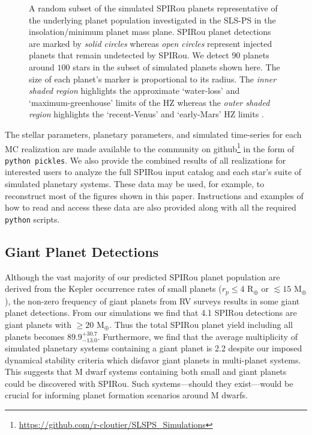 \begin{figure*}
  \centering
  \caption{A random subset of the simulated SPIRou planets representative of the underlying planet
    population investigated in the SLS-PS in the insolation/minimum planet mass plane.
    SPIRou planet detections are marked by
    \emph{solid circles} whereas \emph{open circles} represent injected planets that remain undetected by SPIRou.
    We detect 90 planets around $100$ stars in the subset of simulated planets shown here.
    The size of each planet's marker is proportional to its radius. The \emph{inner shaded region} highlights
    the approximate `water-loss' and `maximum-greenhouse' limits of the HZ whereas the
    \emph{outer shaded region} highlights the `recent-Venus' and `early-Mars' HZ limits \citep{kopparapu13}.}
  \label{BSfig:spiroudet}
\end{figure*}


The stellar parameters, planetary parameters, and simulated time-series for each MC realization are made
available to the community on
github\footnote{\href{https://github.com/r-cloutier/SLSPS\_Simulations}{https://github.com/r-cloutier/SLSPS\_Simulations}}
in the form of \texttt{python pickles}.
We also provide the combined results of all realizations for interested users to analyze the full SPIRou
input catalog and each star's suite of simulated planetary systems. These data may be used, for example,
to reconstruct most of the figures shown in this paper. Instructions and examples of how to read and
access these data are also provided along with all the required \texttt{python} scripts.


\subsection{Giant Planet Detections}
Although the vast majority of our predicted SPIRou planet population are derived from the Kepler occurrence
rates of small planets ($r_p \leq 4$ R$_{\oplus}$ or \msini{} $\lesssim 15$ M$_{\oplus}$), the non-zero frequency
of giant planets from RV surveys results in some giant planet detections. From our simulations we find that
4.1 SPIRou detections are giant planets with \msini{} $\geq 20$ M$_{\oplus}$. Thus the total SPIRou planet yield
including all planets becomes $89.9^{+30.7}_{-13.0}$. Furthermore, we find
that the average multiplicity of simulated planetary systems containing a giant planet is 2.2 despite our
imposed dynamical stability criteria which disfavor giant planets in multi-planet systems. This suggests that
M dwarf systems containing both small and giant planets could be discovered with SPIRou. Such systems---should
they exist---would be crucial for informing planet formation scenarios around M dwarfs.


